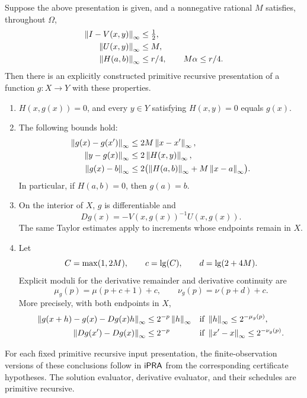 \begin{theorem}
\label{thm:main}
Suppose the above presentation is given, and a nonnegative rational
\(M\) satisfies, throughout \(\Omega\),
\begin{align}
 \left\lVert I-V(x,y)\right\rVert_\infty&\le\tfrac12,\label{eq:vertical}\\
 \left\lVert U(x,y)\right\rVert_\infty&\le M,\label{eq:horizontal}\\
 \left\lVert H(a,b)\right\rVert_\infty&\le r/4,\qquad M\alpha\le r/4.\label{eq:center}
\end{align}
Then there is an explicitly constructed primitive recursive
presentation of a function \(g:X\to Y\) with these properties.
\begin{enumerate}[label=\textup{(\roman*)}]
 \item \(H(x,g(x))=0\), and every \(y\in Y\) satisfying \(H(x,y)=0\)
 equals \(g(x)\).
 \item The following bounds hold:
 \begin{align}
 \left\lVert g(x)-g(x')\right\rVert_\infty&\le 2M\left\lVert x-x'\right\rVert_\infty,\label{eq:glip}\\
 \left\lVert y-g(x)\right\rVert_\infty&\le 2\left\lVert H(x,y)\right\rVert_\infty,\label{eq:apost}\\
 \left\lVert g(x)-b\right\rVert_\infty&\le
 2\bigl(\left\lVert H(a,b)\right\rVert_\infty+M\left\lVert x-a\right\rVert_\infty\bigr).\label{eq:location}
 \end{align}
 In particular, if \(H(a,b)=0\), then \(g(a)=b\).
 \item On the interior of \(X\), \(g\) is differentiable and
 \begin{equation}\label{eq:derivative}
 Dg(x)=-V(x,g(x))^{-1}U(x,g(x)).
 \end{equation}
 The same Taylor estimates apply to increments whose endpoints
 remain in \(X\).
 \item Let
 \[
 C=\max(1,2M),\qquad c=\operatorname{lg}(C),\qquad
 d=\operatorname{lg}(2+4M).
 \]
 Explicit moduli for the derivative remainder and derivative
 continuity are
 \begin{equation}\label{eq:outputmoduli}
 \mu_g(p)=\mu(p+c+1)+c,\qquad
 \nu_g(p)=\nu(p+d)+c.
 \end{equation}
 More precisely, with both endpoints in \(X\),
 \begin{align*}
 \left\lVert g(x+h)-g(x)-Dg(x)h\right\rVert_\infty
 &\le2^{-p}\left\lVert h\right\rVert_\infty
 &&\text{if }\left\lVert h\right\rVert_\infty\le2^{-\mu_g(p)},\\
 \left\lVert Dg(x')-Dg(x)\right\rVert_\infty
 &\le2^{-p}
 &&\text{if }\left\lVert x'-x\right\rVert_\infty\le2^{-\nu_g(p)}.
 \end{align*}
\end{enumerate}
For each fixed primitive recursive input presentation, the
finite-observation versions of these conclusions follow in \(\mathsf{iPRA}\)
from the corresponding certificate hypotheses. The solution
evaluator, derivative evaluator, and their schedules are primitive
recursive.
\end{theorem}

